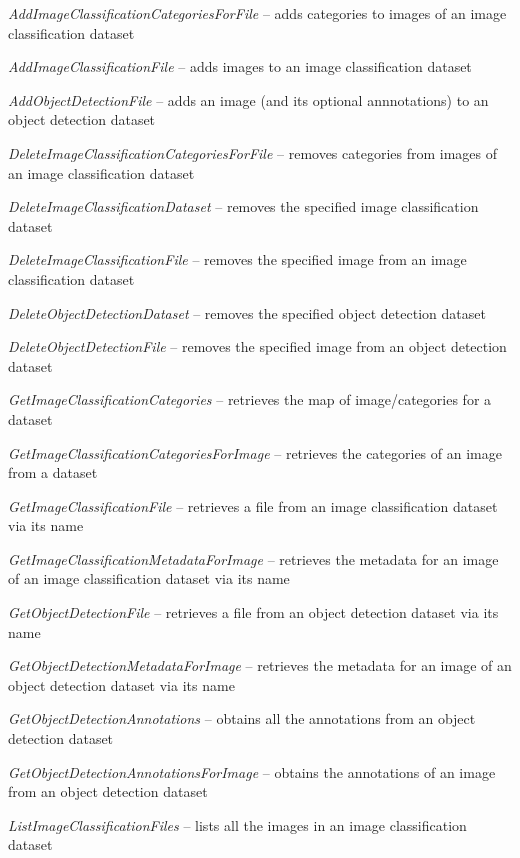 \documentclass[a4paper]{book}
\begin{document}
\begin{tight_itemize}
  \item \textit{AddImageClassificationCategoriesForFile} -- adds categories to images of an image classification dataset
  \item \textit{AddImageClassificationFile} -- adds images to an image classification dataset
  \item \textit{AddObjectDetectionFile} -- adds an image (and its optional annnotations) to an object detection dataset
  \item \textit{DeleteImageClassificationCategoriesForFile} -- removes categories from images of an image classification dataset
  \item \textit{DeleteImageClassificationDataset} -- removes the specified image classification dataset
  \item \textit{DeleteImageClassificationFile} -- removes the specified image from an image classification dataset
  \item \textit{DeleteObjectDetectionDataset} -- removes the specified object detection dataset
  \item \textit{DeleteObjectDetectionFile} -- removes the specified image from an object detection dataset
  \item \textit{GetImageClassificationCategories} -- retrieves the map of image/categories for a dataset
  \item \textit{GetImageClassificationCategoriesForImage} -- retrieves the categories of an image from a dataset
  \item \textit{GetImageClassificationFile} -- retrieves a file from an image classification dataset via its name
  \item \textit{GetImageClassificationMetadataForImage} -- retrieves the metadata for an image of an image classification dataset via its name
  \item \textit{GetObjectDetectionFile} -- retrieves a file from an object detection dataset via its name
  \item \textit{GetObjectDetectionMetadataForImage} -- retrieves the metadata for an image of an object detection dataset via its name
  \item \textit{GetObjectDetectionAnnotations} -- obtains all the annotations from an object detection dataset
  \item \textit{GetObjectDetectionAnnotationsForImage} -- obtains the annotations of an image from an object detection dataset
  \item \textit{ListImageClassificationFiles} -- lists all the images in an image classification dataset

\end{tight_itemize}
\end{document}

